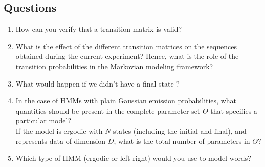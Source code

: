 \documentclass[11pt]{article}
\begin{document}
\subsection{Questions}
\label{sec:org3d681b6}
\begin{enumerate}
\item How can you verify that a transition matrix is valid?
\item What is the effect of the different transition matrices on the
sequences obtained during the current experiment? Hence, what is the
role of the transition probabilities in the Markovian modeling
framework?
\item What would happen if we didn't have a final state ?
\item In the case of HMMs with plain Gaussian emission probabilities, what
quantities should be present in the complete parameter set \(\Theta\)
that specifies a particular model?\\
If the model is ergodic with \(N\) states (including the initial and
final), and represents data of dimension \(D\), what is the total
number of parameters in \(\Theta\)?
\item Which type of HMM (ergodic or left-right) would you use to model
words?
\end{enumerate}
\end{document}

